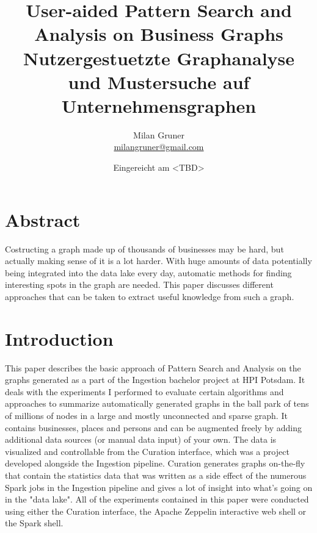 \documentclass[
        a4paper,     %
        titlepage,   %
        twoside,     %
        parskip      %
        ]{scrartcl}  %
\title{
  User-aided Pattern Search and Analysis on Business Graphs
  \\ \bigskip
  \large{Nutzergestuetzte Graphanalyse und Mustersuche auf Unternehmensgraphen}
}
\author{Milan Gruner\\{\small{\url{milangruner@gmail.com}}}}
\date{Eingereicht am <TBD>}
\begin{document}
  \maketitle    %
  \clearpage %

  \section*{Abstract}
  { \huge
    Costructing a graph made up of thousands of businesses may be hard, but actually making sense of it is a lot harder.
    With huge amounts of data potentially being integrated into the data lake every day, automatic methods for finding interesting spots in the graph are needed.
    This paper discusses different approaches that can be taken to extract useful knowledge from such a graph.
  }

  \clearpage
  \tableofcontents


  \section{Introduction}
    This paper describes the basic approach of Pattern Search and Analysis
    on the graphs generated as a part of the Ingestion bachelor project at HPI Potsdam.
    It deals with the experiments I performed to evaluate certain algorithms and approaches to summarize
    automatically generated graphs in the ball park of tens of millions of nodes in
    a large and mostly unconnected and sparse graph.
    It contains businesses, places and persons and can be augmented freely by adding
    additional data sources (or manual data input) of your own. The data is visualized and controllable from the
    Curation interface, which was a project developed alongside the Ingestion pipeline.
    Curation generates graphs on-the-fly that contain the statistics data that was written
    as a side effect of the numerous Spark jobs in the Ingestion pipeline and gives
    a lot of insight into what's going on in the "data lake".
    All of the experiments contained in this paper were conducted using either
    the Curation interface, the Apache Zeppelin interactive web shell or the Spark shell.
\end{document}
